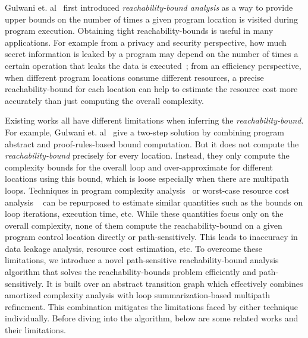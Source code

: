 
Gulwani et. al~\cite{GulwaniZ10} first introduced \emph{reachability-bound analysis} as a way to provide upper bounds on the number of times a given program location 
is visited during program execution.
Obtaining tight reachability-bounds is useful in many applications.
For example from a privacy and security perspective,
how much secret information is leaked by a program may depend on the number of times a certain operation that leaks the data
is executed~\cite{Malacaria07};
from an efficiency perspective, when different program locations consume different resources, a precise reachability-bound for each location can help to estimate the resource cost more accurately than just computing the overall complexity.

Existing works all have different limitations when inferring the \emph{reachability-bound}.
For example, Gulwani et. al~\cite{GulwaniZ10}
give a two-step solution by combining program abstract and proof-rules-based bound computation.
But it does not compute the \emph{reachability-bound} precisely for every location.
Instead, they only compute the complexity bounds for the overall loop and over-approximate for different locations using this bound,
which is loose especially when there are multipath loops.
Techniques in program complexity analysis~\cite{GustafssonEL05,HumenbergerJK18} 
or worst-case resource cost analysis
~\cite{BrockschmidtEFFG16,AlbertAGP08,AliasDFG10,Flores-MontoyaH14} can be repurposed to estimate similar quantities such as the
bounds on loop iterations, execution time, etc.
While these quantities focus only on 
the overall complexity,
none of them compute the reachability-bound on a given program control location directly or path-sensitively.
This leads to inaccuracy in data leakage analysis, resource cost estimation, etc.
To overcome these limitations, 
we introduce a novel path-sensitive reachability-bound analysis algorithm that solves 
the reachability-bounds problem efficiently and path-sensitively.
It is built over an abstract transition graph which effectively combines amortized complexity analysis with loop summarization-based multipath refinement.
This combination mitigates the limitations faced by either technique individually. 
Before diving into the algorithm, below are some related works and their limitations.

